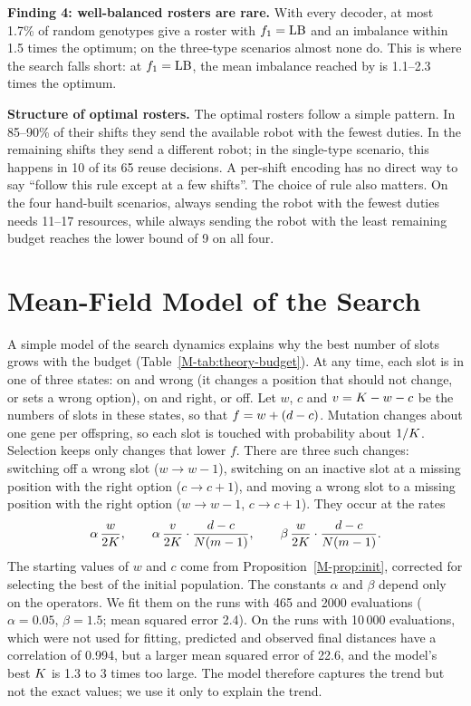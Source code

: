 \documentclass[journal]{IEEEtran}
\begin{document}
\textbf{Finding 4: well-balanced rosters are rare.}
With every decoder, at most 1.7\% of random genotypes give a roster with $f_{1} = \mathrm{LB}$ and an imbalance within 1.5 times the optimum;
on the three-type scenarios almost none do.
This is where the search falls short: at $f_{1} = \mathrm{LB}$, the mean imbalance reached by  is 1.1--2.3 times the optimum.

\textbf{Structure of optimal rosters.}
The optimal rosters follow a simple pattern.
In 85--90\% of their shifts they send the available robot with the fewest duties.
In the remaining shifts they send a different robot; in the single-type scenario, this happens in 10 of its 65 reuse decisions.
A per-shift encoding has no direct way to say ``follow this rule except at a few shifts''.
The choice of rule also matters.
On the four hand-built scenarios, always sending the robot with the fewest duties needs 11--17 resources,
while always sending the robot with the least remaining budget reaches the lower bound of 9 on all four.



\section{Mean-Field Model of the Search}
\label{sec:s-meanfield}

A simple model of the search dynamics explains why the best number of slots grows with the budget (Table~\ref{M-tab:theory-budget}).
At any time, each slot is in one of three states:
on and wrong (it changes a position that should not change, or sets a wrong option), on and right, or off.
Let $w$, $c$ and $v = K - w - c$ be the numbers of slots in these states, so that $f = w + (d - c)$.
Mutation changes about one gene per offspring, so each slot is touched with probability about $1/K$.
Selection keeps only changes that lower $f$.
There are three such changes: switching off a wrong slot ($w \to w-1$),
switching on an inactive slot at a missing position with the right option ($c \to c+1$),
and moving a wrong slot to a missing position with the right option ($w \to w-1$, $c \to c+1$).
They occur at the rates
\begin{equation}
  \alpha\, \frac{w}{2K}, \qquad
  \alpha\, \frac{v}{2K} \cdot \frac{d - c}{N(m-1)}, \qquad
  \beta\, \frac{w}{2K} \cdot \frac{d - c}{N(m-1)}.
\end{equation}
The starting values of $w$ and $c$ come from Proposition~\ref{M-prop:init}, corrected for selecting the best of the initial population.
The constants $\alpha$ and $\beta$ depend only on the operators.
We fit them on the runs with 465 and 2000 evaluations ($\alpha = 0.05$, $\beta = 1.5$; mean squared error 2.4).
On the runs with 10\,000 evaluations, which were not used for fitting, predicted and observed final distances have a correlation of 0.994,
but a larger mean squared error of 22.6, and the model's best $K$ is 1.3 to 3 times too large.
The model therefore captures the trend but not the exact values; we use it only to explain the trend.
\end{document}
